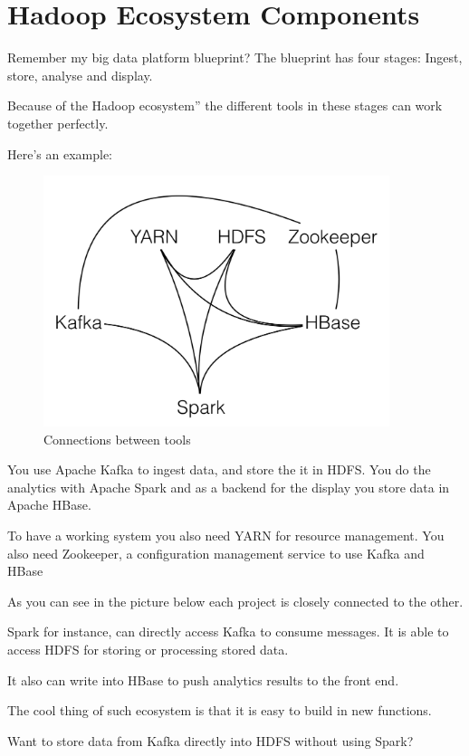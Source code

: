 \documentclass[12pt, numbers=noenddot]{scrreprt} %
\begin{document}
\section{Hadoop Ecosystem Components}
Remember my big data platform blueprint? The blueprint has four stages: Ingest, store, analyse and display.

Because of the Hadoop ecosystem” the different tools in these stages can work together perfectly.

Here’s an example:
\begin{figure}[htbp]
  \centering
     \includegraphics[width=0.9\textwidth]{images/Hadoop-Ecosystem-Connections.png}
  \caption{Connections between tools}
  \label{fig:Bild1}
\end{figure}

You use Apache Kafka to ingest data, and store the it in HDFS. You do the analytics with Apache Spark and as a backend for the display you store data in Apache HBase.

To have a working system you also need YARN for resource management. You also need Zookeeper, a configuration management service to use Kafka and HBase

As you can see in the picture below each project is closely connected to the other.

Spark for instance, can directly access Kafka to consume messages. It is able to access HDFS for storing or processing stored data.

It also can write into HBase to push analytics results to the front end.


The cool thing of such ecosystem is that it is easy to build in new functions.

Want to store data from Kafka directly into HDFS without using Spark?
\end{document}
